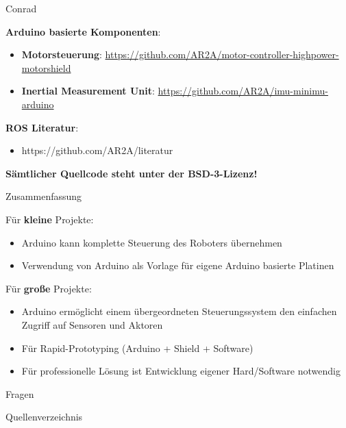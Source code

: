 \documentclass{beamer}
\begin{document}
\begin{frame}{Conrad}
\begin{large}\textbf{Arduino basierte Komponenten}:\end{large}
\begin{itemize}
	\item \textbf{Motorsteuerung}: \url{https://github.com/AR2A/motor-controller-highpower-motorshield}
\end{itemize}
\begin{itemize}
	\item \textbf{Inertial Measurement Unit}: \url{https://github.com/AR2A/imu-minimu-arduino}
\end{itemize}
\vspace{20px}
\begin{large}\textbf{ROS Literatur}:\end{large}
\begin{itemize}
	\item https://github.com/AR2A/literatur
\end{itemize}
\vspace{20px}
\begin{large}\textbf{S\"amtlicher Quellcode steht unter der BSD-3-Lizenz!}\end{large}
\end{frame}
\begin{frame}{Zusammenfassung}
\begin{large}F\"ur \textbf{kleine} Projekte:\end{large}
\begin{itemize}
	\item Arduino kann komplette Steuerung des Roboters \"ubernehmen
	\item Verwendung von Arduino als Vorlage f\"ur eigene Arduino basierte Platinen
\end{itemize}
\vspace{20px}
\begin{large}F\"ur \textbf{gro\ss{}e} Projekte:\end{large}
\begin{itemize}
	\item Arduino erm\"oglicht einem \"ubergeordneten Steuerungssystem den einfachen Zugriff auf Sensoren und Aktoren
	\item F\"ur Rapid-Prototyping (Arduino + Shield + Software)
	\item F\"ur professionelle L\"osung ist Entwicklung eigener Hard/Software notwendig
\end{itemize}
\end{frame}
\begin{frame}
	\Huge{\centerline{Fragen}}
\end{frame}
\begin{frame}[allowframebreaks]{Quellenverzeichnis}
\scriptsize{}
\end{frame}
\end{document}
